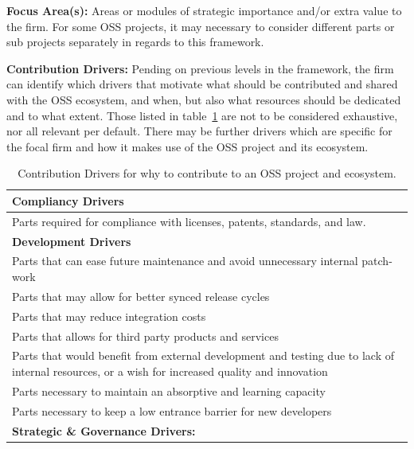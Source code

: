 \documentclass[a4paper]{llncs}
\begin{document}
\noindent\textbf{Focus Area(s):} Areas or modules of strategic importance and/or extra value to the firm. For some OSS projects, it may necessary to consider different parts or sub projects separately in regards to this framework.

\noindent\textbf{Contribution Drivers:} Pending on previous levels in the framework, the firm can identify which drivers that motivate what should be contributed and shared with the OSS ecosystem, and when, but also what resources should be dedicated and to what extent. Those listed in table~\ref{tbl:drivers} are not to be considered exhaustive, nor all relevant per default. There may be further drivers which are specific for the focal firm and how it makes use of the OSS project and its ecosystem.

\begin{table}[t!]
\centering
\caption{Contribution Drivers for why to contribute to an OSS project and ecosystem.}
\label{tbl:drivers}
\begin{tabular}{p{12.1cm}}
    \toprule
    \footnotesize
\textbf{Compliancy Drivers} 
    \\ 
    \midrule
    \footnotesize
    Parts required for compliance with licenses, patents, standards, and law.        
    \\
    \midrule
    \footnotesize
\textbf{Development Drivers}                                              
    \\     
    \midrule 
    \footnotesize
    Parts that can ease future maintenance and avoid unnecessary internal patch-work 
    \\ 
    \footnotesize
    Parts that may allow for better synced release cycles
    \\ 
    \footnotesize
    Parts that may reduce integration costs
    \\ 
    \footnotesize
    Parts that allows for third party products and services
    \\ 
    \footnotesize
    Parts that would benefit from external development and testing due to lack of internal resources, or a wish for increased quality and innovation
    \\ 
    \footnotesize
    Parts necessary to maintain an absorptive and learning capacity
    \\ 
    \footnotesize
    Parts necessary to keep a low entrance barrier for new developers
    \\ 
    \midrule
    \footnotesize
\textbf{Strategic \& Governance Drivers:}
    \\ 

\end{tabular}
\end{table}
\end{document}
